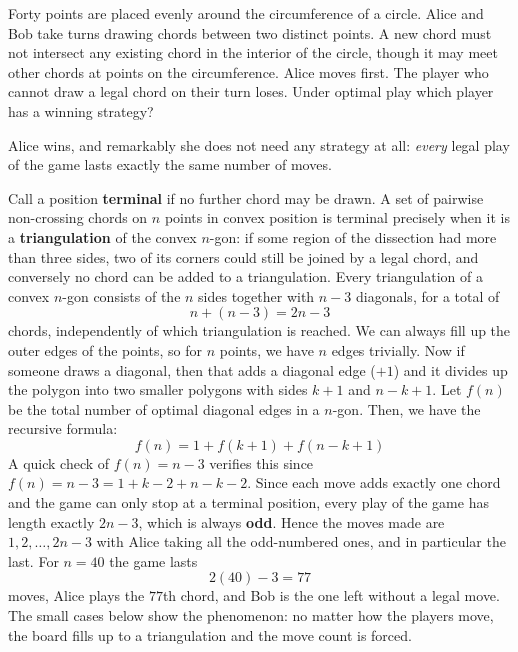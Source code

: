	\begin{exercise}
		Forty points are placed evenly around the circumference of a circle. Alice and Bob take turns drawing chords between two distinct points. A new chord must not intersect any existing chord in the interior of the circle, though it may meet other chords at points on the circumference. Alice moves first. The player who cannot draw a legal chord on their turn loses. Under optimal play which player has a winning strategy?
	\end{exercise}
	\begin{solution}
		Alice wins, and remarkably she does not need any strategy at all: \textit{every} legal play of the game lasts exactly the same number of moves.

		Call a position \textbf{terminal} if no further chord may be drawn. A set of pairwise non-crossing chords on $n$ points in convex position is terminal precisely when it is a \textbf{triangulation} of the convex $n$-gon: if some region of the dissection had more than three sides, two of its corners could still be joined by a legal chord, and conversely no chord can be added to a triangulation. Every triangulation of a convex $n$-gon consists of the $n$ sides together with $n-3$ diagonals, for a total of
		\begin{equation}
		  n + (n-3) = 2n-3
		\end{equation}
		chords, independently of which triangulation is reached. We can always fill up the outer edges of the points, so for $n$ points, we have $n$ edges trivially. Now if someone draws a diagonal, then that adds a diagonal edge ($+1$) and it divides up the polygon into two smaller polygons with sides $k + 1$ and $n - k + 1$. Let $f(n)$ be the total number of optimal diagonal edges in a $n$-gon. Then, we have the recursive formula: 
		\begin{equation}
			f(n) = 1 + f(k + 1) + f(n-k + 1)
		\end{equation}
		A quick check of $f(n) = n - 3$ verifies this since $f(n) = n - 3 = 1 + k - 2 + n - k - 2$. Since each move adds exactly one chord and the game can only stop at a terminal position, every play of the game has length exactly $2n-3$, which is always \textbf{odd}. Hence the moves made are $1, 2, \ldots, 2n-3$ with Alice taking all the odd-numbered ones, and in particular the last. For $n=40$ the game lasts
		\begin{equation}
		  2(40) - 3 = 77
		\end{equation}
		moves, Alice plays the $77$th chord, and Bob is the one left without a legal move. The small cases below show the phenomenon: no matter how the players move, the board fills up to a triangulation and the move count is forced.


\end{solution}
